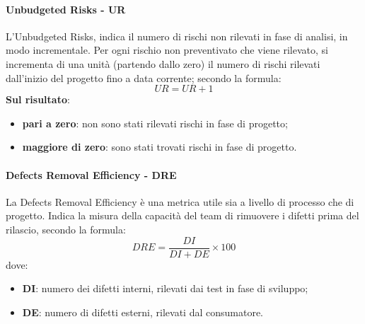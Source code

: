 	 \paragraph{Unbudgeted Risks - UR}
	 L'Unbudgeted Risks, indica il numero di rischi non rilevati in fase di analisi, in modo incrementale. Per ogni rischio non preventivato che viene rilevato, si incrementa di una unità (partendo dallo zero) il numero di rischi rilevati dall'inizio del progetto fino a data corrente; secondo la formula:
	 \begin{displaymath}
	 	UR = UR + 1 
	 \end{displaymath}
 	{\bfseries Sul risultato}:
 	\begin{itemize}
 		\item {\bfseries pari a zero}: non sono stati rilevati rischi in fase di progetto;
 		\item {\bfseries maggiore di zero}: sono stati trovati rischi in fase di progetto.\\
 	\end{itemize}
	 \paragraph{Defects Removal Efficiency - DRE}
	 La Defects Removal Efficiency è una metrica utile sia a livello di processo che di progetto. Indica la misura della capacità del team di rimuovere i difetti prima del rilascio, secondo la formula:
	 \begin{displaymath}
	 DRE = \frac{DI}{DI+DE}\times100
	 \end{displaymath}
 	dove:
 	\begin{itemize}
 		\item {\bfseries DI}: numero dei difetti interni, rilevati dai test in fase di sviluppo;
 		\item {\bfseries DE}: numero di difetti esterni, rilevati dal consumatore.\\
 		
 	\end{itemize}
 
	 
		 
